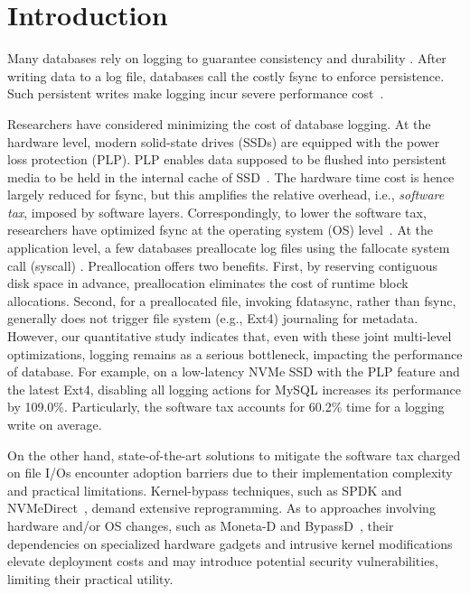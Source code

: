 \section{Introduction}\label{sec:intro_background}

Many databases rely on logging to guarantee  consistency and durability 
\cite{DB:OceanBase:VLDB-2022,mysql2013mysql}.
After writing data  to a log file, databases call the costly fsync  to enforce persistence.
Such persistent writes make logging incur severe performance cost~\cite{lee2015waldio}.

Researchers have considered  minimizing the cost of database logging.
At the hardware level, modern solid-state drives (SSDs) are equipped with the power loss protection (PLP). 
PLP enables data supposed to be flushed into persistent media to be
held in the internal cache of SSD~\cite{SSD:PLP:TC-2016,PLP:samsung}.
The hardware time cost  is hence largely reduced for fsync, but 
this  amplifies the relative overhead, i.e., {\em software tax}, imposed by    software layers.
Correspondingly,
to lower the software tax,
researchers
have optimized fsync  at the operating system (OS)
 level~\cite{fsync:rethink:OSDI-2006,fsync:OptFS:SOSP-2013,fsync:FastCommit:ATC-2024,fsync:iJournaling:ATC-2017,fsync:RFLUSH:FAST-2018}.
At the application level, a few databases
  preallocate log files using the fallocate system call (syscall) \cite{DB:OceanBase:VLDB-2022,mysql2013mysql}.
 Preallocation offers two   benefits. First, by reserving contiguous disk space in advance,
 preallocation
 eliminates the   cost 
of runtime block  allocations.
Second, for a preallocated file, invoking fdatasync, rather than fsync, generally does not trigger file system (e.g., Ext4) journaling for metadata.
However, our quantitative study indicates that, even with these joint multi-level optimizations,
logging remains as a serious bottleneck, impacting the performance of database. 
For example, on a low-latency NVMe SSD  with the PLP feature and the latest Ext4,
 disabling all logging actions for MySQL  \cite{mysql2013mysql}
increases its performance by 109.0\%.
Particularly,
the software tax accounts for 60.2\% time for a logging write on average.

On the other hand,
state-of-the-art solutions to mitigate the software tax charged on file I/Os
encounter  adoption barriers due to their implementation complexity and practical limitations. Kernel-bypass techniques, such as SPDK \cite{SSD:SPDK:CloudCom-2017} and NVMeDirect~\cite{SSD:NVMeDirect:HotStorage-2016}, demand extensive reprogramming.
As to approaches involving hardware and/or OS changes, such as Moneta-D \cite{SSD:Moneta-D:ASPLOS-2012} and BypassD~\cite{SSD:BypassD:ASPLOS-2024}, 
their dependencies on   specialized hardware gadgets and intrusive kernel modifications
elevate deployment costs and may introduce potential security vulnerabilities,   limiting their practical utility.

